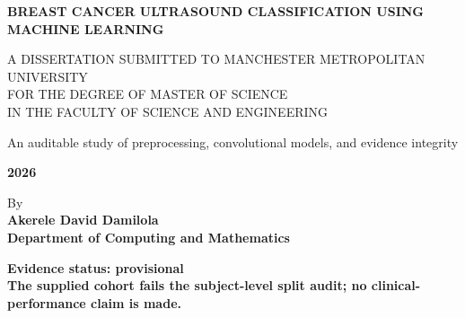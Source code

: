 \documentclass[12pt,a4paper,oneside]{report}
\begin{document}
\hypersetup{pageanchor=false}
\begin{titlepage}
    \centering
    \vspace*{1.5cm}
    {\Huge \bfseries BREAST CANCER ULTRASOUND CLASSIFICATION USING MACHINE LEARNING \par}
    \vspace{1.2cm}
    {\Large A DISSERTATION SUBMITTED TO MANCHESTER METROPOLITAN UNIVERSITY\\ FOR THE DEGREE OF MASTER OF SCIENCE\\ IN THE FACULTY OF SCIENCE AND ENGINEERING \par}
    \vspace{1.5cm}
    {\large An auditable study of preprocessing, convolutional models, and evidence integrity\par}
    \vspace{1.8cm}
    {\large \bfseries 2026 \par}
    \vspace{0.8cm}
    {\large By\\ \bfseries Akerele David Damilola \\ Department of Computing and Mathematics \par}
    \vfill
    \colorbox{Goldenrod!18}{%
        \parbox{0.78\textwidth}{\centering\small\bfseries Evidence status: provisional\\[2pt]
        \normalfont The supplied cohort fails the subject-level split audit; no clinical-performance claim is made.}%
    }
\end{titlepage}
\hypersetup{pageanchor=true}






\tableofcontents
\listoffigures
\listoftables

\clearpage
{}










\end{document}
